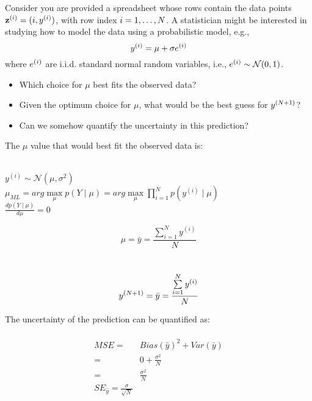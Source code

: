 \documentclass[article,11pt]{article}
\begin{document}
Consider you are provided a spreadsheet whose rows contain the data points ${\bf z}^{(i)}=(i,y^{(i)})$, with row index $i=1,\ldots,N$.  
A statistician might be interested in studying how to model the data using a probabilistic model, e.g., 
\begin{equation} 
y^{(i)} = \mu + \sigma e^{(i)} 
\end{equation}
where $e^{(i)}$ are i.i.d. standard normal random variables, i.e., $e^{(i)} \sim \mathcal{N}(0,1)$.
\begin{itemize}
\item Which choice for $\mu$ best fits the observed data?
\item Given the optimum choice for $\mu$, what would be the best guess for $y^{(N+1)}$?
\item Can we somehow quantify the uncertainty in this prediction?
\end{itemize}


The $\mu$ value that would best fit the observed data is: \\
 \\ 
\begin{center}
$y^{(i)} \sim \mathcal{N}(\mu,\sigma^{2})$ \\
$\mu_{{ML}}=arg\mathop{max}\limits_{\mu}p(Y \mid \mu) = arg\mathop{max}\limits_{\mu}\prod\limits_{i=1}^{N}p(y^{(i)}\mid \mu)$\\
$\frac{dp(Y \mid \mu)}{d \mu}=0$
\end{center}

\begin{equation}
	\mu = \bar{y}= \frac{\sum\limits_{i=1}^{N}y^{(i)}}{N}
\end{equation}

 \\
\begin{equation}
y^{(N+1)} = \bar{y}= \frac{\sum\limits_{i=1}^{N}y^{(i)}}{N}
\end{equation}

The uncertainty of the prediction can be quantified as: \\
 \\
\begin{equation}
\begin{aligned}
MSE = & Bias(\bar{y})^{2}+Var(\bar{y}) \\
	= & 0 + \frac{\sigma^{2}}{N} \\
	= & \frac{\sigma^{2}}{N}\\
	SE_{\bar{y}} = \frac{\sigma}{\sqrt{N}}\\
\end{aligned}
\end{equation}
\end{document}
